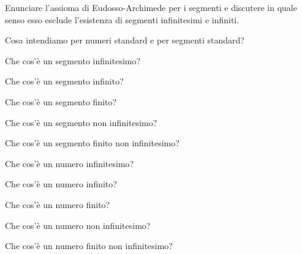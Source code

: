 \begin{multicols}{2}

\begin{esercizio}\label{ese:iper_001}
Enunciare l'assioma di Eudosso-Archimede per i 
segmenti e discutere in quale
senso esso esclude l'esistenza di segmenti infinitesimi e infiniti.
\end{esercizio}

\begin{esercizio}\label{ese:iper_002}
Cosa intendiamo per numeri standard e per segmenti standard?
\end{esercizio}

\begin{esercizio}\label{ese:iper_003}
Che cos'è un segmento infinitesimo?
\end{esercizio}

\begin{esercizio}\label{ese:iper_004}
Che cos'è un segmento infinito?
\end{esercizio}

\begin{esercizio}\label{ese:iper_005}
Che cos'è un segmento finito?
\end{esercizio}

\begin{esercizio}\label{ese:iper_006}
Che cos'è un segmento non infinitesimo?
\end{esercizio}

\begin{esercizio}\label{ese:iper_007}
Che cos'è un segmento finito non infinitesimo?
\end{esercizio}

\begin{esercizio}\label{ese:iper_008}
Che cos'è un numero infinitesimo?
\end{esercizio}

\begin{esercizio}\label{ese:iper_009}
Che cos'è un numero infinito?
\end{esercizio}

\begin{esercizio}\label{ese:iper_010}
Che cos'è un numero finito?
\end{esercizio}

\begin{esercizio}\label{ese:iper_011}
Che cos'è un numero non infinitesimo?
\end{esercizio}

\begin{esercizio}\label{ese:iper_012}
Che cos'è un numero finito non infinitesimo?
\end{esercizio}


\end{multicols}
